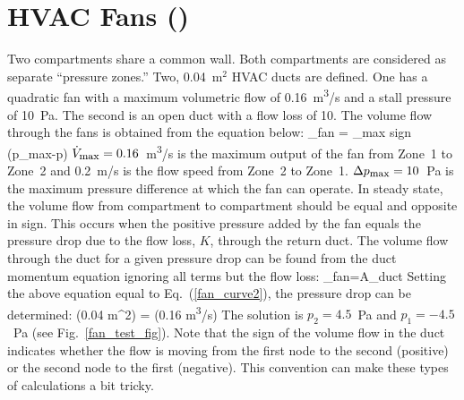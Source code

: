 \documentclass[11pt]{book}
\begin{document}
\clearpage

\section{HVAC Fans (\texorpdfstring{}{fan\_test})}
\label{fan_test}

Two compartments share a common wall. Both compartments are considered as separate ``pressure zones.'' Two, 0.04~m$^2$ HVAC ducts are defined.  One has a quadratic fan with a maximum volumetric flow of 0.16~\si{m^3/s} and a stall pressure of 10~Pa. The second is an open duct with a flow loss of 10. The volume flow through the fans is obtained from the equation below:
\be
   _{\hbox{\footnotesize fan}} = _{\hbox{\footnotesize max}} \; \hbox{sign} (\Delta p_{\hbox{\footnotesize max}}-\Delta p)   \label{fan_curve2}
\ee
$\dot{V}_{\hbox{\footnotesize max}}=0.16$~\si{m^3/s} is the maximum output of the fan from Zone~1 to Zone~2 and 0.2~m/s is the flow speed from Zone~2 to Zone~1. $\Delta p_{\hbox{\footnotesize max}}=10$~Pa is the maximum pressure difference at which the fan can operate. In steady state, the volume flow from compartment to compartment should be equal and opposite in sign. This occurs when the positive pressure added by the fan equals the pressure drop due to the flow loss, $K$, through the return duct.  The volume flow through the duct for a given pressure drop can be found from the duct momentum equation ignoring all terms but the flow loss:
\be
   _{\hbox{\footnotesize fan}}=A_{\hbox{\footnotesize duct}} 
\ee
Setting the above equation equal to Eq.~(\ref{fan_curve2}), the pressure drop can be determined:
\be
    (0.04 \; \hbox{m}^2) = (0.16 \; \hbox{\si{m^3/s}})  \; 
\ee
The solution is $p_2=4.5$~Pa and $p_1=-4.5$~Pa (see Fig.~\ref{fan_test_fig}). Note that the sign of the volume flow in the duct indicates whether the flow is moving from the first node to the second (positive) or the second node to the first (negative). This convention can make these types of calculations a bit tricky.
\end{document}
